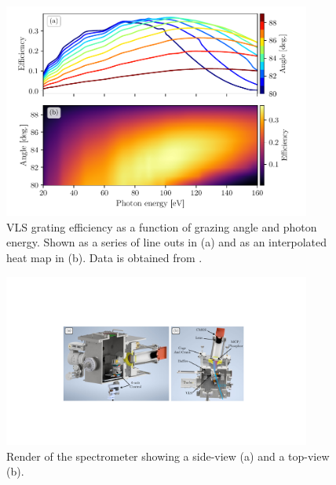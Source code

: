 \begin{figure}
	\centering
	\includegraphics[width=0.9\textwidth]{figures/Beamline/grating_efficiency.pdf}
	\caption[VLS grating efficiency as a function of incident angle and photon energy]{VLS grating efficiency as a function of grazing angle and photon energy.  Shown as a series of line outs in (a) and as an interpolated heat map in (b).  Data is obtained from \cite{hageDevelopmentXUVSpectrometer}.}
	\label{fig:grating_efficiency}
\end{figure}

\begin{figure}
	\centering
	\includegraphics[width=0.9\textwidth]{figures/Beamline/CAD_spectrometer.pdf}
	\caption[CAD render of the TABLe spectrometer]{Render of the spectrometer showing a side-view (a) and a top-view (b).}
	\label{fig:CAD_spectrometer}
\end{figure}

